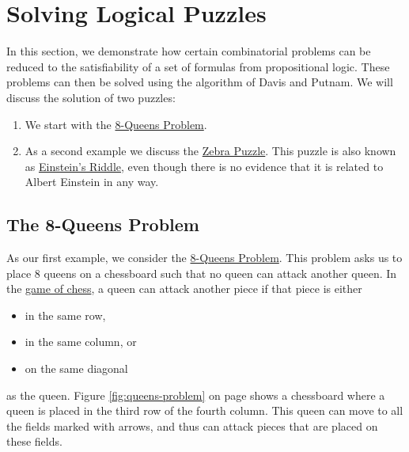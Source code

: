 \section{Solving Logical Puzzles}
In this section, we demonstrate how certain combinatorial problems can be reduced to the satisfiability of a
set of formulas from propositional logic.  These problems can then be solved using the algorithm of
Davis and Putnam.  We will discuss the solution of two puzzles:
\begin{enumerate}
\item We start with the
      \href{https://en.wikipedia.org/wiki/Eight_queens_puzzle}{8-Queens Problem}. 
\item As a second example we discuss the
      \href{https://en.wikipedia.org/wiki/Zebra_puzzle}{Zebra Puzzle}.  This puzzle is also known as
      \href{https://www.brainzilla.com/logic/zebra/einsteins-riddle/}{Einstein's Riddle},
      even though there is no evidence that it is related to Albert Einstein in any way.
\end{enumerate}

\subsection{The 8-Queens Problem}
As our first example, we consider the
\href{https://en.wikipedia.org/wiki/Eight_queens_puzzle}{8-Queens Problem}. 
This problem asks us to place 8 queens on a chessboard such that no queen can attack another queen.
In the \href{https://en.wikipedia.org/wiki/Chess}{game of chess}, a queen can attack another piece if that
piece is either 
\begin{itemize}
\item in the same row,
\item in the same column, or
\item on the same diagonal
\end{itemize}
as the queen. Figure \ref{fig:queens-problem} on page \pageref{fig:queens-problem}
shows a chessboard where a queen is placed in the third row of the fourth
column. This queen can move to all 
the fields marked with arrows, and thus can attack pieces that are placed on these fields.



